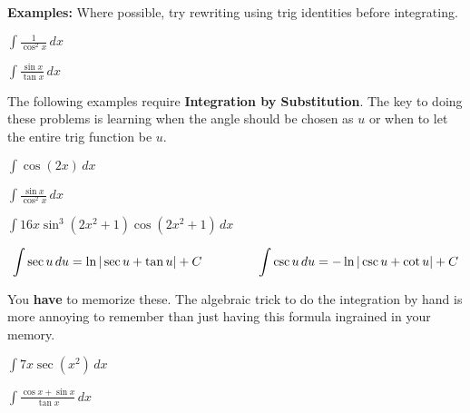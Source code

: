\documentclass[addpoints, 12pt]{exam}
\begin{document}
\noindent\textbf{Examples:} Where possible, try rewriting using trig identities before integrating.
\begin{questions}
    \question $\displaystyle\int\frac{1}{\cos^2 x}\,dx$
    
    \question $\displaystyle\int\frac{\sin x}{\tan x}\,dx$
    
    
    The following examples require \textbf{Integration by Substitution}. The key to doing these problems is learning when the angle should be chosen as $u$ or when to let the entire trig function be $u$.
    
    \begin{minipage}{0.45\linewidth}
        \question $\displaystyle\int\cos(2x)\,dx$    
    \end{minipage}
    \hfill
    \begin{minipage}{0.45\linewidth}
        \question $\displaystyle\int\frac{\sin x}{\cos^2 x}\,dx$
    \end{minipage}
    
    
    \newpage
    
    \question $\displaystyle\int 16x\sin^3\left(2x^2+1\right)\cos\left(2x^2+1\right) \,dx$
\end{questions}

\begin{tcolorbox}[title= INTEGRAL OF SECANT AND COSECANT,colframe=black,sharp corners,colback=white,colbacktitle=white,coltitle=black,boxrule=1pt]

    \[\displaystyle\int\sec u\,du=\ln|\sec u+\tan u|+C \hspace{.6in}\int\csc u\,du=-\ln|\csc u + \cot u|+C\]
    
\end{tcolorbox}
You \textbf{have} to memorize these. The algebraic trick to do the integration by hand is more annoying to remember than just having this formula ingrained in your memory.

\begin{questions}
    \question $\displaystyle \int 7x\sec(x^2)\,dx$
    
    
    \question $\displaystyle \int \frac{\cos x+\sin x}{\tan x}\,dx$
    
\end{questions}
\end{document}
